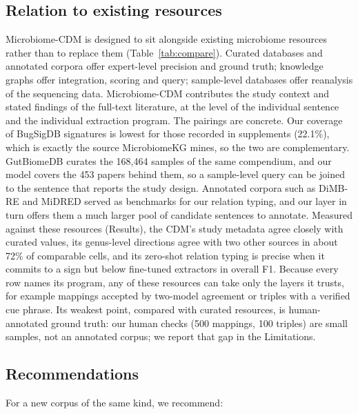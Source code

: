 \documentclass[referee,lineno,pdflatex,sn-vancouver-num]{sn-jnl}
\theoremstyle{thmstyleone}%
\theoremstyle{thmstyletwo}%
\theoremstyle{thmstylethree}%
\begin{document}
\subsection{Relation to existing resources}\label{sec:compare}
Microbiome-CDM is designed to sit alongside existing microbiome resources
rather than to replace them (Table~\ref{tab:compare}). Curated databases and
annotated corpora offer expert-level precision and ground truth;
knowledge graphs offer integration, scoring and query; sample-level databases
offer reanalysis of the sequencing data. Microbiome-CDM contributes the
study context and stated findings of the full-text literature, at the level
of the individual sentence and the individual extraction program. The pairings
are concrete. Our coverage of BugSigDB signatures is lowest for those recorded
in supplements (22.1\%), which is exactly the source MicrobiomeKG mines, so
the two are complementary. GutBiomeDB curates the 168,464 samples of the same
compendium, and our model covers the 453 papers behind them, so a sample-level
query can be joined to the sentence that reports the study design. Annotated corpora such as DiMB-RE and MiDRED served as benchmarks for our
relation typing, and our layer in turn offers them a much larger pool of
candidate sentences to annotate. Measured against these resources (Results),
the CDM's study metadata agree closely with curated values, its genus-level
directions agree with two other sources in about 72\% of comparable
cells, and its zero-shot relation typing is precise when it commits to a sign
but below fine-tuned extractors in overall F1.
Because every row names its program, any of these resources can take only the
layers it trusts, for example mappings accepted by two-model agreement or
triples with a verified cue phrase. Its weakest point, compared with curated
resources, is human-annotated ground truth: our human checks (500 mappings,
100 triples) are small samples, not an annotated corpus; we report that gap in
the Limitations.

\subsection{Recommendations}\label{sec:recommendations}
For a new corpus of the same kind, we recommend:
\end{document}
